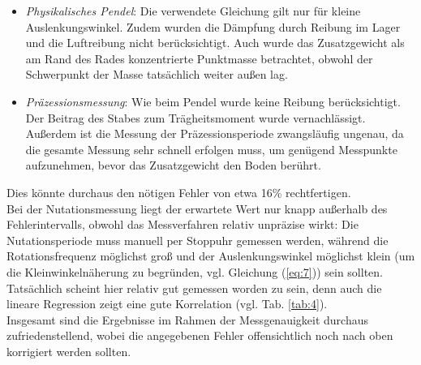 \begin{itemize}
	\item \textit{Physikalisches Pendel}: Die verwendete Gleichung gilt nur für kleine Auslenkungswinkel. Zudem wurden 												  die Dämpfung durch Reibung im Lager und die Luftreibung nicht berücksichtigt. 											  Auch wurde das Zusatzgewicht als am Rand des Rades konzentrierte Punktmasse 												  betrachtet, obwohl der Schwerpunkt der Masse tatsächlich weiter außen lag.
	\item \textit{Präzessionsmessung}: Wie beim Pendel wurde keine Reibung berücksichtigt. Der Beitrag des Stabes zum 						  					   Trägheitsmoment wurde vernachlässigt. Außerdem ist die Messung der 														   Präzessionsperiode zwangsläufig ungenau, da die gesamte Messung sehr schnell 											   erfolgen muss, um genügend Messpunkte aufzunehmen, bevor das Zusatzgewicht den 											   Boden berührt.
\end{itemize}
Dies könnte durchaus den nötigen Fehler von etwa 16\% rechtfertigen.\\
Bei der Nutationsmessung liegt der erwartete Wert nur knapp außerhalb des Fehlerintervalls, obwohl das Messverfahren relativ unpräzise wirkt: Die Nutationsperiode muss manuell per Stoppuhr gemessen werden, während die Rotationsfrequenz möglichst groß und der Auslenkungswinkel möglichst klein (um die Kleinwinkelnäherung zu begründen, vgl. Gleichung (\ref{eq:7})) sein sollten. Tatsächlich scheint hier relativ gut gemessen worden zu sein, denn auch die lineare Regression zeigt eine gute Korrelation (vgl. Tab. \ref{tab:4}).\\
Insgesamt sind die Ergebnisse im Rahmen der Messgenauigkeit durchaus zufriedenstellend, wobei die angegebenen Fehler offensichtlich noch nach oben korrigiert werden sollten.